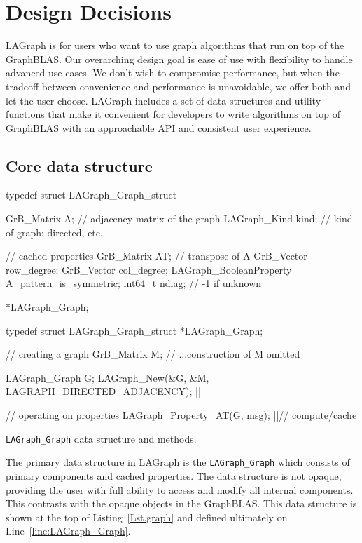 \section{Design Decisions}
\label{sec:decisions}

LAGraph is for users who want to use graph algorithms that run on top of the GraphBLAS.  
Our overarching design goal is ease of use with flexibility to handle advanced use-cases.
We don't wish to compromise performance, but when the tradeoff between convenience and performance
is unavoidable, we offer both and let the user choose.
LAGraph includes a set of data structures and utility functions 
that make it convenient for developers to write algorithms on top of GraphBLAS with 
an approachable API and consistent user experience.

\subsection{Core data structure}

\begin{listing}
\begin{cplus}
typedef struct LAGraph_Graph_struct
{
    GrB_Matrix   A;      // adjacency matrix of the graph
    LAGraph_Kind kind;   // kind of graph: directed, etc.
    
    // cached properties
    GrB_Matrix   AT;     // transpose of A
    GrB_Vector   row_degree;
    GrB_Vector   col_degree;
    LAGraph_BooleanProperty A_pattern_is_symmetric;
    int64_t      ndiag;  // -1 if unknown
} *LAGraph_Graph;

typedef struct LAGraph_Graph_struct *LAGraph_Graph; |$\label{line:LAGraph_Graph}$|

// creating a graph
GrB_Matrix M;
// ...construction of M omitted

LAGraph_Graph G;
LAGraph_New(&G, &M, LAGRAPH_DIRECTED_ADJACENCY); |$\label{line:CreateGraphObject}$|

// operating on properties
LAGraph_Property_AT(G, msg);  |$\label{line:ComputeTranspose}$|// compute/cache
\end{cplus}
\caption{{\tt LAGraph\_Graph} data structure and methods.}
\label{Lst.graph}
\end{listing}

The primary data structure in LAGraph is the \verb'LAGraph_Graph' which consists of primary components
and cached properties. The data structure is not opaque, providing the user with full ability to access and
modify all internal components. This contrasts with the opaque objects in the GraphBLAS.  This data structure is 
shown at the top of Listing~\ref{Lst.graph} and defined ultimately on Line~\ref{line:LAGraph_Graph}.


